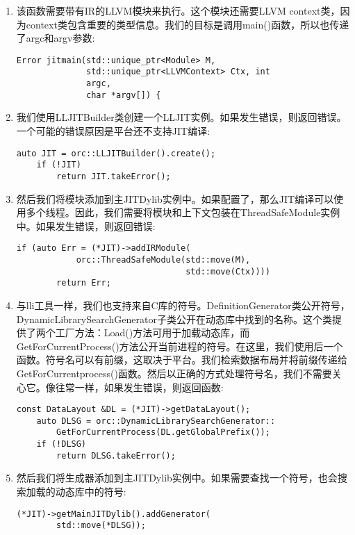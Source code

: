\begin{enumerate}
\item 该函数需要带有IR的LLVM模块来执行。这个模块还需要LLVM context类，因为context类包含重要的类型信息。我们的目标是调用main()函数，所以也传递了argc和argv参数:
\begin{lstlisting}[caption={}]
Error jitmain(std::unique_ptr<Module> M,
			  std::unique_ptr<LLVMContext> Ctx, int 
			  argc,
			  char *argv[]) {
\end{lstlisting}

\item 我们使用LLJITBuilder类创建一个LLJIT实例。如果发生错误，则返回错误。一个可能的错误原因是平台还不支持JIT编译:
\begin{lstlisting}[caption={}]
	auto JIT = orc::LLJITBuilder().create();
	if (!JIT)
		return JIT.takeError();
\end{lstlisting}

\item 然后我们将模块添加到主JITDylib实例中。如果配置了，那么JIT编译可以使用多个线程。因此，我们需要将模块和上下文包装在ThreadSafeModule实例中。如果发生错误，则返回错误:
\begin{lstlisting}[caption={}]
	if (auto Err = (*JIT)->addIRModule(
			orc::ThreadSafeModule(std::move(M),
								  std::move(Ctx))))
		return Err;
\end{lstlisting}

\item 与lli工具一样，我们也支持来自C库的符号。DefinitionGenerator类公开符号，DynamicLibrary\allowbreak SearchGenerator子类公开在动态库中找到的名称。这个类提供了两个工厂方法：Load()方法可用于加载动态库，而GetForCurrentProcess()方法公开当前进程的符号。在这里，我们使用后一个函数。符号名可以有前缀，这取决于平台。我们检索数据布局并将前缀传递给GetForCurrentprocess()函数。然后以正确的方式处理符号名，我们不需要关心它。像往常一样，如果发生错误，则返回函数:
\begin{lstlisting}[caption={}]
	const DataLayout &DL = (*JIT)->getDataLayout();
	auto DLSG = orc::DynamicLibrarySearchGenerator::
		GetForCurrentProcess(DL.getGlobalPrefix());
	if (!DLSG)
		return DLSG.takeError();
\end{lstlisting}

\item 然后我们将生成器添加到主JITDylib实例中。如果需要查找一个符号，也会搜索加载的动态库中的符号:
\begin{lstlisting}[caption={}]
	(*JIT)->getMainJITDylib().addGenerator(
		std::move(*DLSG));
\end{lstlisting}


\end{enumerate}

